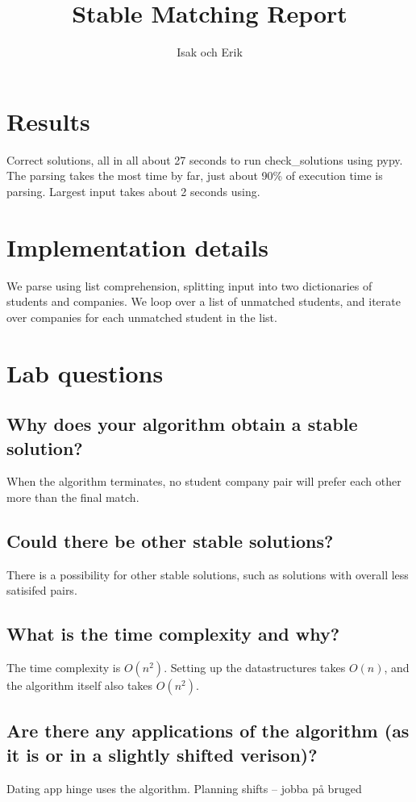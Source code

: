 \documentclass{article}
\title{Stable Matching Report}
\author{Isak och Erik}
\begin{document}
  \maketitle

  \section{Results}

  Correct solutions, all in all about 27 seconds to run check\_solutions using pypy. The parsing takes the most time by far, just about 90\% of execution time is parsing.
  Largest input takes about 2 seconds using.

  \section{Implementation details}

  We parse using list comprehension, splitting input into two dictionaries of students and companies. We loop over a list of unmatched students,
  and iterate over companies for each unmatched student in the list. 

  \section{Lab questions}

  \subsection{Why does your algorithm obtain a stable solution?}

  When the algorithm terminates, no student company pair will prefer each other more than the final match. 

  \subsection{Could there be other stable solutions?}

  There is a possibility for other stable solutions, such as solutions with overall less satisifed pairs.

  \subsection{What is the time complexity and why?}

  The time complexity is $O({n}^2)$. Setting up the datastructures takes $O(n)$, and the algorithm itself also takes $O({n}^2)$.

  \subsection{Are there any applications of the algorithm (as it is or in a slightly shifted verison)?}

  Dating app hinge uses the algorithm. 
  Planning shifts -- jobba på bruged
\end{document}
